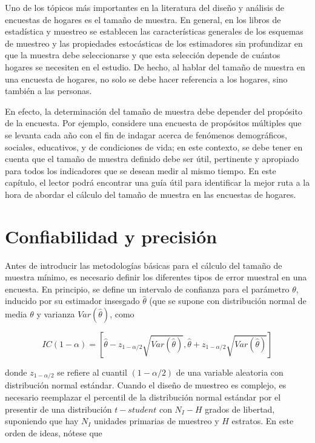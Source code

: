\documentclass[
  12pt,
  spanish,
]{book}
\begin{document}
Uno de los tópicos más importantes en la literatura del diseño y análisis de encuestas de hogares es el tamaño de muestra. En general, en los libros de estadística y muestreo se establecen las características generales de los esquemas de muestreo y las propiedades estocásticas de los estimadores sin profundizar en que la muestra debe seleccionarse y que esta selección depende de cuántos hogares se necesiten en el estudio. De hecho, al hablar del tamaño de muestra en una encuesta de hogares, no solo se debe hacer referencia a los hogares, sino también a las personas.

En efecto, la determinación del tamaño de muestra debe depender del propósito de la encuesta. Por ejemplo, considere una encuesta de propósitos múltiples que se levanta cada año con el fin de indagar acerca de fenómenos demográficos, sociales, educativos, y de condiciones de vida; en este contexto, se debe tener en cuenta que el tamaño de muestra definido debe ser útil, pertinente y apropiado para todos los indicadores que se desean medir al mismo tiempo. En este capítulo, el lector podrá encontrar una guía útil para identificar la mejor ruta a la hora de abordar el cálculo del tamaño de muestra en las encuestas de hogares.

\hypertarget{confiabilidad-y-precisiuxf3n}{%
\section{Confiabilidad y precisión}\label{confiabilidad-y-precisiuxf3n}}

Antes de introducir las metodologías básicas para el cálculo del tamaño de muestra mínimo, es necesario definir los diferentes tipos de error muestral en una encuesta. En principio, se define un intervalo de confianza para el parámetro \(\theta\), inducido por su estimador insesgado \(\hat{\theta}\) (que se supone con distribución normal de media \(\theta\) y varianza \(Var(\hat{\theta})\), como

\[
IC(1-\alpha)=\left[\hat{\theta}-z_{1-\alpha / 2}\sqrt{ Var(\hat{\theta})},\hat{\theta}+z_{1-\alpha / 2}\sqrt{Var(\hat{\theta})}\right]
\]

donde \(z_{1-\alpha / 2}\) se refiere al cuantil \((1-\alpha / 2)\) de una variable aleatoria con distribución normal estándar. Cuando el diseño de muestreo es complejo, es necesario reemplazar el percentil de la distribución normal estándar por el presentir de una distribución \(t-student\) con \(N_I - H\) grados de libertad, suponiendo que hay \(N_I\) unidades primarias de muestreo y \(H\) estratos. En este orden de ideas, nótese que
\end{document}
